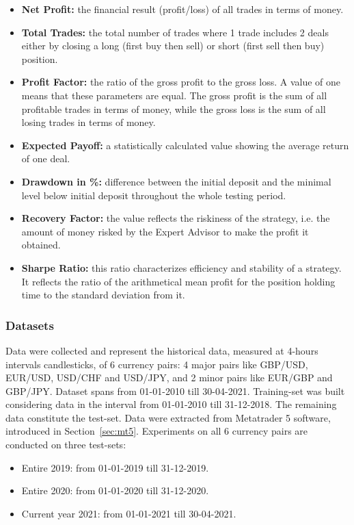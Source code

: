 \begin{itemize}
\setlength\itemsep{0.3em}
\item \textbf{Net Profit:} the financial result (profit/loss) of all trades in terms of money.
\item \textbf{Total Trades:} the total number of trades where 1 trade includes 2 deals either by closing a long (first buy then sell) or short (first sell then buy) position.
\item \textbf{Profit Factor:} the ratio of the gross profit to the gross loss. A value of one means that these parameters are equal. The gross profit is the sum of all profitable trades in terms of money, while the gross loss is the sum of all losing trades in terms of money.
\item \textbf{Expected Payoff:} a statistically calculated value showing the average return of one deal. 
\item \textbf{Drawdown in \%:} difference between the initial deposit and the minimal level below initial deposit throughout the whole testing period.
\item \textbf{Recovery Factor:} the value reflects the riskiness of the strategy, i.e. the amount of money risked by the Expert Advisor to make the profit it obtained.
\item \textbf{Sharpe Ratio:} this ratio characterizes efficiency and stability of a strategy. It reflects the ratio of the arithmetical mean profit for the position holding time to the standard deviation from it.
\end{itemize}

\subsubsection{Datasets}
Data were collected and represent the historical data, measured at 4-hours intervals candlesticks, of 6 currency pairs: 4 major pairs like GBP/USD, EUR/USD, USD/CHF and USD/JPY, and 2 minor pairs like EUR/GBP and GBP/JPY.
Dataset spans from 01-01-2010 till 30-04-2021. Training-set was built considering data in the interval from 01-01-2010 till 31-12-2018. The remaining data constitute the test-set. Data were extracted from Metatrader 5 software, introduced in Section~\ref{sec:mt5}. 
Experiments on all 6 currency pairs are conducted on three test-sets:
\begin{itemize}
\setlength\itemsep{0.3em}
\item Entire 2019: from 01-01-2019 till 31-12-2019.
\item Entire 2020: from 01-01-2020 till 31-12-2020.
\item Current year 2021: from 01-01-2021 till 30-04-2021.
\end{itemize}

